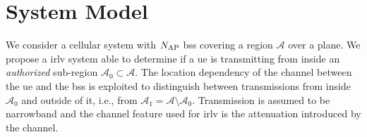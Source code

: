 \documentclass[conference,draftcls,onecolumn]{IEEEtran}
\begin{document}

 
\section{System Model}\label{sec:sys model}


We consider a cellular system with $N_{\rm AP}$ \acp{bs} covering a region $\mathcal{A}$ over a plane. We propose a \ac{irlv} system able to determine if a \ac{ue} is transmitting from inside an {\em authorized} sub-region $\mathcal{A}_0 \subset \mathcal{A}$. The location dependency of the channel between the \ac{ue} and the \acp{bs} is exploited to distinguish between transmissions from inside $\mathcal{A}_0$ and outside of it, i.e., from  $\mathcal{A}_1=\mathcal{A} \setminus \mathcal{A}_0$.  Transmission is assumed to be narrowband and the channel feature used for \ac{irlv} is the attenuation introduced by the channel.
\end{document}
